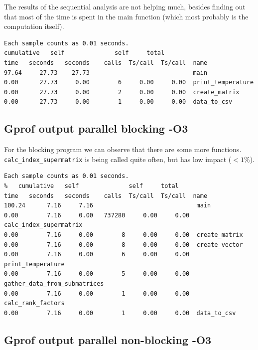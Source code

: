 \documentclass[UTF-8]{article}
\begin{document}
\begin{itemize}
The results of the sequential analysis are not helping much, besides finding out that most of the time is spent in the main function (which most probably is the computation itself).
\begin{lstlisting}
Each sample counts as 0.01 seconds.
cumulative   self              self     total           
time   seconds   seconds    calls  Ts/call  Ts/call  name    
97.64     27.73    27.73                             main
0.00      27.73     0.00        6     0.00     0.00  print_temperature
0.00      27.73     0.00        2     0.00     0.00  create_matrix
0.00      27.73     0.00        1     0.00     0.00  data_to_csv	
\end{lstlisting}



\subsection*{Gprof output parallel blocking -O3}

For the blocking program we can observe that there are some more functions. \verb|calc_index_supermatrix| is being called quite often, but has low impact ($< 1 \%$).
\begin{lstlisting}
Each sample counts as 0.01 seconds.
%   cumulative   self              self     total           
time   seconds   seconds    calls  Ts/call  Ts/call  name    
100.24      7.16     7.16                             main
0.00        7.16     0.00   737280     0.00     0.00  calc_index_supermatrix
0.00        7.16     0.00        8     0.00     0.00  create_matrix
0.00        7.16     0.00        8     0.00     0.00  create_vector
0.00        7.16     0.00        6     0.00     0.00  print_temperature
0.00        7.16     0.00        5     0.00     0.00  gather_data_from_submatrices
0.00        7.16     0.00        1     0.00     0.00  calc_rank_factors
0.00        7.16     0.00        1     0.00     0.00  data_to_csv
\end{lstlisting}


\subsection*{Gprof output parallel non-blocking -O3}


\end{itemize}
\end{document}
